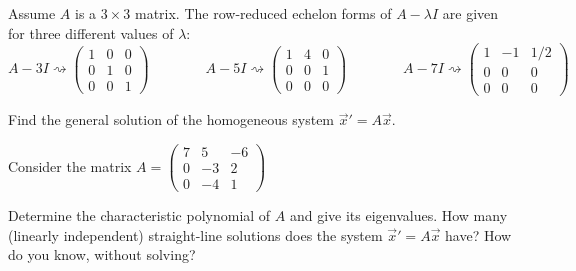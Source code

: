 \documentclass{ximera}
\begin{document}
\begin{exercise}
    Assume $A$ is a $3\times 3$ matrix. The row-reduced echelon forms of $A-\lambda I$ are given for three different values of $\lambda$: $$A-3I \rightsquigarrow \begin{pmatrix} 1&0&0\\ 0&1&0\\ 0&0&1 \end{pmatrix} \qquad\qquad  A-5I \rightsquigarrow \begin{pmatrix} 1&4&0\\ 0&0&1\\ 0&0&0 \end{pmatrix}\qquad\qquad A-7I \rightsquigarrow \begin{pmatrix} 1&-1&1/2\\ 0&0&0\\ 0&0&0 \end{pmatrix}$$
    
    Find the general solution of the homogeneous system $\vec{x}'=A\vec{x}$.
\end{exercise}

\begin{exercise}
    Consider the matrix
    $A=\displaystyle \begin{pmatrix} 
        7 & 5 & -6 \\
        0 & -3 & 2 \\
        0  & -4 & 1 
    \end{pmatrix}$
    \begin{tasks}
        \task Determine the characteristic polynomial of $A$ and give its eigenvalues.
        \task How many (linearly independent) straight-line solutions does the system ${\vec{x}}'=A\vec{x}$ have? How do you know, without solving? 
    \end{tasks}
\end{exercise}
\end{document}
